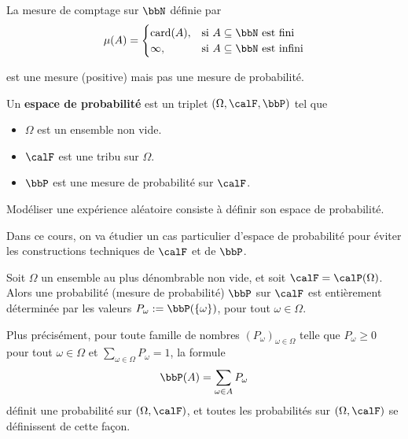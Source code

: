 \begin{exem}
    La mesure de comptage sur $\bbN$ définie par
    \[ \mu(A) =
        \begin{cases}
            \card(A), & \text{si } A \subseteq \bbN \text{ est fini}   \\
            \infty,   & \text{si } A \subseteq \bbN \text{ est infini}
        \end{cases}
    \]

    est une mesure (positive) mais pas une mesure de probabilité.
\end{exem}

\begin{deff}
    Un \textbf{espace de probabilité} est un triplet $(\Omega, \calF, \bbP)$ tel que
    \begin{itemize}
        \item $\Omega$ est un ensemble non vide.
        \item $\calF$ est une tribu sur $\Omega$.
        \item $\bbP$ est une mesure de probabilité sur $\calF$.
    \end{itemize}
\end{deff}

Modéliser une expérience aléatoire consiste à définir son espace de probabilité.

Dans ce cours, on va étudier un cas particulier d'espace de probabilité
pour éviter les constructions techniques de $\calF$ et de $\bbP$.

\begin{thm}
    Soit $\Omega$ un ensemble au plus dénombrable non vide, et soit $\calF = \calP(\Omega)$.
    Alors une probabilité (mesure de probabilité) $\bbP$ sur $\calF$ est entièrement déterminée
    par les valeurs $P_\omega := \bbP(\{ \omega \})$, pour tout $\omega \in \Omega$.
\end{thm}

\begin{rqq}
    Plus précisément, pour toute famille de nombres $(P_\omega)_{\omega \in \Omega}$ telle que
    $P_\omega \geqslant 0$ pour tout $\omega \in \Omega$ et $\sum_{\omega \in \Omega} P_\omega = 1$,
    la formule
    \[ \bbP(A) = \sum_{\omega \in A} P_\omega \]
    définit une probabilité sur $(\Omega, \calF)$,
    et toutes les probabilités sur $(\Omega, \calF)$ se définissent de cette façon.
\end{rqq}

